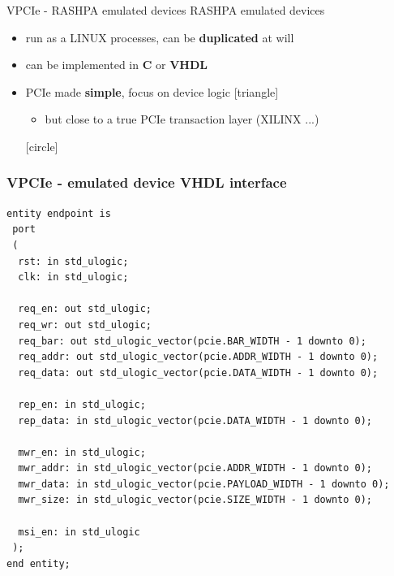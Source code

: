 \documentclass{beamer}
\begin{document}
\begin{frame}{VPCIe - RASHPA emulated devices}
  RASHPA emulated devices
  \begin{itemize}
  \item run as a LINUX processes, can be \textbf{duplicated} at will
  \item can be implemented in \textbf{C} or \textbf{VHDL}
  \item PCIe made \textbf{simple}, focus on device logic
    [triangle]
    \begin{itemize}
    \item but close to a true PCIe transaction layer (XILINX ...)
    \end{itemize}
    [circle]
  \end{itemize}
\end{frame}

\begin{frame}[containsverbatim]
 \frametitle{VPCIe - emulated device VHDL interface}
 \begin{tiny}
 \lstset{language=VHDL}
 \begin{lstlisting}[frame=tb]
entity endpoint is
 port
 (
  rst: in std_ulogic;
  clk: in std_ulogic;

  req_en: out std_ulogic;
  req_wr: out std_ulogic;
  req_bar: out std_ulogic_vector(pcie.BAR_WIDTH - 1 downto 0);
  req_addr: out std_ulogic_vector(pcie.ADDR_WIDTH - 1 downto 0);
  req_data: out std_ulogic_vector(pcie.DATA_WIDTH - 1 downto 0);

  rep_en: in std_ulogic;
  rep_data: in std_ulogic_vector(pcie.DATA_WIDTH - 1 downto 0);

  mwr_en: in std_ulogic;
  mwr_addr: in std_ulogic_vector(pcie.ADDR_WIDTH - 1 downto 0);
  mwr_data: in std_ulogic_vector(pcie.PAYLOAD_WIDTH - 1 downto 0);
  mwr_size: in std_ulogic_vector(pcie.SIZE_WIDTH - 1 downto 0);

  msi_en: in std_ulogic
 );
end entity;
 \end{lstlisting}
 \end{tiny}
\end{frame}
\end{document}
